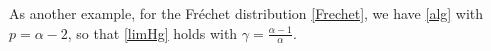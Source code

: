 \documentclass{article}
\numberwithin{equation}{section}
\begin{document}
As another example, for the Fr\'echet 
distribution \eqref{Frechet}, we have
\eqref{alg} with $p=\alpha-2$, so that
\eqref{limHg} holds with 
$\gamma=\frac{\alpha-1}{\alpha}$.








%
%
%
\end{document}

